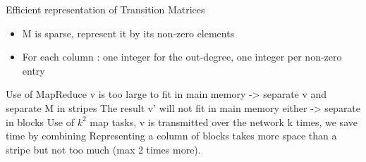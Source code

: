 \documentclass[10pt]{beamer}
\begin{document}
\begin{frame}{Efficient representation of Transition Matrices}
\begin{itemize}
\item M is sparse, represent it by its non-zero elements
\item For each column : one integer for the out-degree, one integer per non-zero entry
\end{itemize}
\end{frame}
\begin{frame}{Use of MapReduce}
v is too large to fit in main memory -> separate v and separate M in stripes
The result v' will not fit in main memory either -> separate in blocks
Use of $k^2$ map tasks, v is transmitted over the network k times, we save time by combining
Representing a column of blocks takes more space than a stripe but not too much (max 2 times more).
\end{frame}
\end{document}

